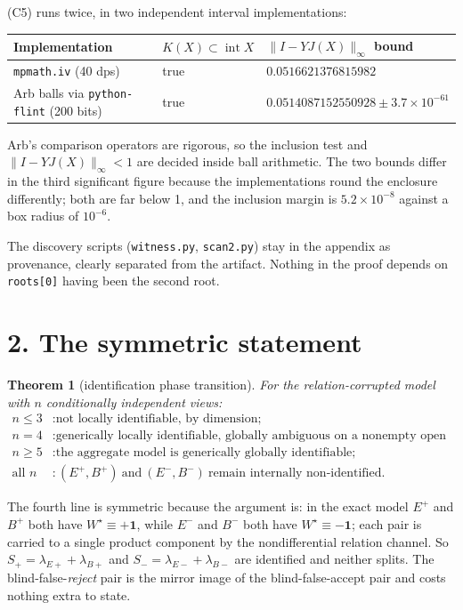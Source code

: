 \documentclass[11pt]{article}
\newtheorem{theorem}{Theorem}
\theoremstyle{remark}
\newcommand{\one}{\mathbf{1}}
\begin{document}
(C5) runs twice, in two independent interval implementations:
\begin{center}\small
\begin{tabular}{@{}lll@{}}
\toprule
Implementation & $K(X)\subset\operatorname{int}X$ & $\|I-YJ(X)\|_\infty$ bound\\
\midrule
\texttt{mpmath.iv} (40 dps) & true & $0.0516621376815982$\\
Arb balls via \texttt{python-flint} (200 bits) & true & $0.0514087152550928\pm3.7\times10^{-61}$\\
\bottomrule
\end{tabular}
\end{center}
Arb's comparison operators are rigorous, so the inclusion test and $\|I-YJ(X)\|_\infty<1$ are decided inside ball arithmetic. The two bounds differ in the third significant figure because the implementations round the enclosure differently; both are far below 1, and the inclusion margin is $5.2\times10^{-8}$ against a box radius of $10^{-6}$.

The discovery scripts (\texttt{witness.py}, \texttt{scan2.py}) stay in the appendix as provenance, clearly separated from the artifact. Nothing in the proof depends on \texttt{roots[0]} having been the second root.

\section*{2. The symmetric statement}

\begin{theorem}[identification phase transition]
For the relation-corrupted model with $n$ conditionally independent views:
\[
\boxed{\begin{array}{ll}
n\le3 &: \text{not locally identifiable, by dimension;}\\[1mm]
n=4 &: \text{generically locally identifiable, globally ambiguous on a nonempty open set;}\\[1mm]
n\ge5 &: \text{the aggregate model is generically globally identifiable;}\\[1mm]
\text{all }n &: (E^+,B^+)\ \text{and}\ (E^-,B^-)\ \text{remain internally non-identified.}
\end{array}}
\]
\end{theorem}

The fourth line is symmetric because the argument is: in the exact model $E^+$ and $B^+$ both have $W^\star\equiv+\one$, while $E^-$ and $B^-$ both have $W^\star\equiv-\one$; each pair is carried to a single product component by the nondifferential relation channel. So $S_+=\lambda_{E+}+\lambda_{B+}$ and $S_-=\lambda_{E-}+\lambda_{B-}$ are identified and neither splits. The blind-false-\emph{reject} pair is the mirror image of the blind-false-accept pair and costs nothing extra to state.
\end{document}
